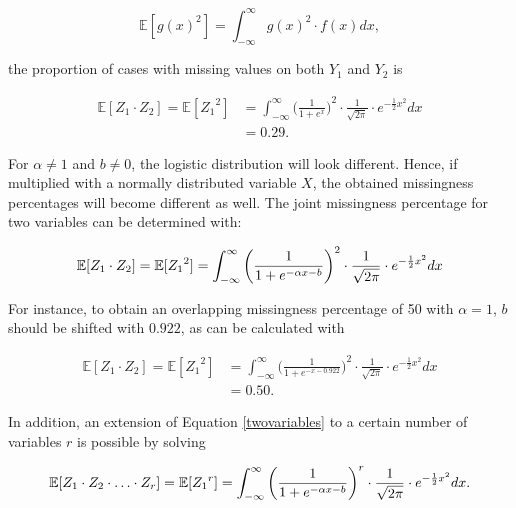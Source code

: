\documentclass[11pt,a4paper]{article}
\begin{document}
\begin{equation*}
\mathbb{E}[{g(x)}^2] = \int_{-\infty}^\infty {g(x)}^2 \cdot f(x) dx, 
\end{equation*}

\noindent the proportion of cases with missing values on both $Y_1$ and $Y_2$ is

\begin{align}
\mathbb{E}[Z_1 \cdot Z_2] = \mathbb{E}[{Z_1}^2] & = \int_{-\infty}^\infty {\bigg(\frac{1}{1 + e^x}\bigg)}^2 \cdot \frac{1}{\sqrt{2\pi}}\cdot e^{-\frac{1}{2}x^2} dx \nonumber \\
& = 0.29. \label{29}
\end{align}

\noindent For $\alpha \neq 1$ and $b \neq 0$, the logistic distribution will look different. Hence, if multiplied with a normally distributed variable $X$, the obtained missingness percentages will become different as well. The joint missingness percentage for two variables can be determined with: 

\begin{equation} \label{twovariables}
\mathbb{E}[Z_1 \cdot Z_2] = \mathbb{E}[{Z_1}^2] = \int_{-\infty}^\infty {\bigg(\frac{1}{1 + e^{-\alpha x - b}}\bigg)}^2 \cdot \frac{1}{\sqrt{2\pi}}\cdot e^{-\frac{1}{2}x^2} dx\\
\end{equation}

\noindent For instance, to obtain an overlapping missingness percentage of 50 with $\alpha = 1$, $b$ should be shifted with $0.922$, as can be calculated with 

\begin{align*}
\mathbb{E}[Z_1 \cdot Z_2] = \mathbb{E}[{Z_1}^2] &= \int_{-\infty}^\infty {\bigg(\frac{1}{1 + e^{-x - 0.922}}\bigg)}^2 \cdot \frac{1}{\sqrt{2\pi}}\cdot e^{-\frac{1}{2}x^2} dx\\
&= 0.50.
\end{align*}

\noindent In addition, an extension of Equation \eqref{twovariables} to a certain number of variables $r$ is possible by solving 

\begin{equation*}
\mathbb{E}[Z_1 \cdot Z_2 \cdot \hdots \cdot Z_r] = \mathbb{E}[{Z_1}^r] = \int_{-\infty}^\infty {\bigg(\frac{1}{1 + e^{-\alpha x - b}}\bigg)}^r \cdot \frac{1}{\sqrt{2\pi}}\cdot e^{-\frac{1}{2}x^2} dx.\\
\end{equation*}
\end{document}
